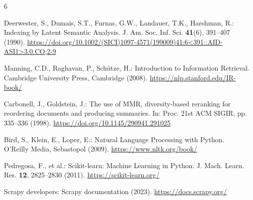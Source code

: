 \documentclass{llncs}
\begin{document}

\begin{thebibliography}{6}

Deerwester, S., Dumais, S.T., Furnas, G.W., Landauer, T.K., Harshman, R.:
Indexing by Latent Semantic Analysis.
J. Am. Soc. Inf. Sci. \textbf{41}(6), 391--407 (1990).
\url{https://doi.org/10.1002/(SICI)1097-4571(199009)41:6<391::AID-ASI1>3.0.CO;2-9}

Manning, C.D., Raghavan, P., Schütze, H.:
Introduction to Information Retrieval.
Cambridge University Press, Cambridge (2008).
\url{https://nlp.stanford.edu/IR-book/}

Carbonell, J., Goldstein, J.:
The use of MMR, diversity-based reranking for reordering documents and
producing summaries.
In: Proc. 21st ACM SIGIR, pp. 335--336 (1998).
\url{https://doi.org/10.1145/290941.291025}

Bird, S., Klein, E., Loper, E.:
Natural Language Processing with Python.
O'Reilly Media, Sebastopol (2009).
\url{https://www.nltk.org/book/}

Pedregosa, F., et al.:
Scikit-learn: Machine Learning in Python.
J. Mach. Learn. Res. \textbf{12}, 2825--2830 (2011).
\url{https://scikit-learn.org/}

Scrapy developers:
Scrapy documentation (2023).
\url{https://docs.scrapy.org/}

\end{thebibliography}
\end{document}
